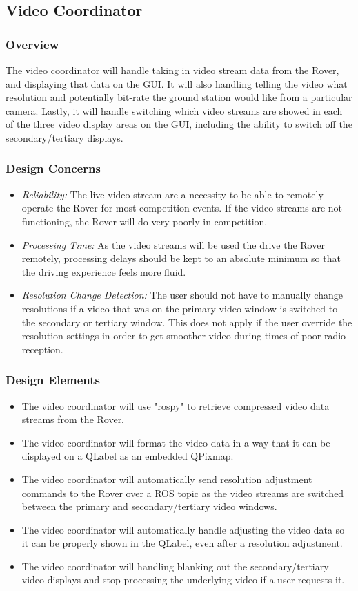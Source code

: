 \subsection{Video Coordinator}
\subsubsection{Overview}
The video coordinator will handle taking in video stream data from the Rover, and displaying that data on the GUI.
It will also handling telling the video what resolution and potentially bit-rate the ground station would like from a particular camera.
Lastly, it will handle switching which video streams are showed in each of the three video display areas on the GUI, including the ability to switch off the secondary/tertiary displays.

\subsubsection{Design Concerns}
\begin{itemize}
\item \textit{Reliability:} The live video stream are a necessity to be able to remotely operate the Rover for most competition events. 
If the video streams are not functioning, the Rover will do very poorly in competition.
\item \textit{Processing Time:} As the video streams will be used the drive the Rover remotely, processing delays should be kept to an absolute minimum so that the driving experience feels more fluid.
\item \textit{Resolution Change Detection:} The user should not have to manually change resolutions if a video that was on the primary video window is switched to the secondary or tertiary window.
This does not apply if the user override the resolution settings in order to get smoother video during times of poor radio reception.
\end{itemize}

\subsubsection{Design Elements}
\begin{itemize}
\item The video coordinator will use "rospy" to retrieve compressed video data streams from the Rover.
\item The video coordinator will format the video data in a way that it can be displayed on a QLabel as an embedded QPixmap.
\item The video coordinator will automatically send resolution adjustment commands to the Rover over a ROS topic as the video streams are switched between the primary and secondary/tertiary video windows.
\item The video coordinator will automatically handle adjusting the video data so it can be properly shown in the QLabel, even after a resolution adjustment.
\item The video coordinator will handling blanking out the secondary/tertiary video displays and stop processing the underlying video if a user requests it.
\end{itemize}

